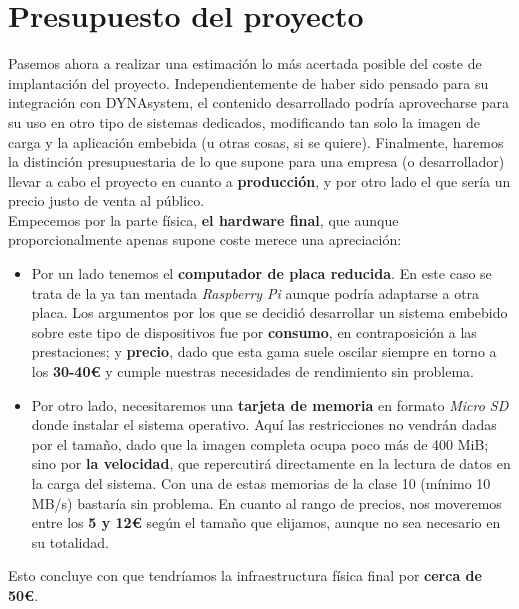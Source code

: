 \chapter{Presupuesto del proyecto}

Pasemos ahora a realizar una estimación lo más acertada posible del coste de implantación del proyecto. Independientemente de haber sido pensado para su integración con DYNAsystem, el contenido desarrollado podría aprovecharse para su uso en otro tipo de sistemas dedicados, modificando tan solo la imagen de carga y la aplicación embebida (u otras cosas, si se quiere). Finalmente, haremos la distinción presupuestaria de lo que supone para una empresa (o desarrollador) llevar a cabo el proyecto en cuanto a \textbf{producción}, y por otro lado el que sería un precio justo de venta al público.\\

Empecemos por la parte física, \textbf{el hardware final}, que aunque proporcionalmente apenas supone coste merece una apreciación:

\begin{itemize}
	\item Por un lado tenemos el \textbf{computador de placa reducida}. En este caso se trata de la ya tan mentada \textit{Raspberry Pi} aunque podría adaptarse a otra placa. Los argumentos por los que se decidió desarrollar un sistema embebido sobre este tipo de dispositivos fue por \textbf{consumo}, en contraposición a las prestaciones; y \textbf{precio}, dado que esta gama suele oscilar siempre en torno a los \textbf{30-40€} \cite{raspberry-pi-amazon} y cumple nuestras necesidades de rendimiento sin problema.
	\item Por otro lado, necesitaremos una \textbf{tarjeta de memoria} en formato \textit{Micro SD} donde instalar el sistema operativo. Aquí las restricciones no vendrán dadas por el tamaño, dado que la imagen completa ocupa poco más de 400 MiB; sino por \textbf{la velocidad}, que repercutirá directamente en la lectura de datos en la carga del sistema. Con una de estas memorias de la clase 10 (mínimo 10 MB/s) bastaría sin problema. En cuanto al rango de precios, nos moveremos entre los \textbf{5 y 12€} según el tamaño que elijamos, aunque no sea necesario en su totalidad.
\end{itemize}

Esto concluye con que tendríamos la infraestructura física final por \textbf{cerca de 50€}.\\

\noindent\makebox[\linewidth]{\rule{\textwidth}{0.4pt}}\\

